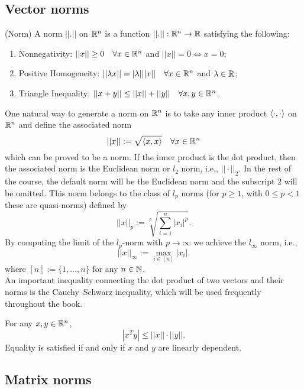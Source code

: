 \documentclass[10pt,a4paper]{article}
\begin{document}
\subsection{Vector norms}
\begin{definition} (Norm)
	A norm $||.||$ on $\mathbb{R}^n$ is a function $||.||:\mathbb{R}^n \to \mathbb{R}$ satisfying the following:
	\begin{enumerate}
		\item Nonnegativity: $||x|| \geq 0 \quad \forall x \in \mathbb{R}^n$ and $||x|| = 0 \Leftrightarrow x =0$;
		\item Positive Homogeneity:  $||\lambda x|| = |\lambda| ||x|| \quad \forall x \in \mathbb{R}^n$ and $\lambda\in \mathbb{R}$;
		\item Triangle Inequality: $||x+y|| \leq ||x|| + ||y|| \quad \forall x,y \in \mathbb{R}^n$.
	\end{enumerate}
\end{definition}
One natural way to generate a norm on $\mathbb{R}^n$ is to take any inner product $\langle \cdot, \cdot \rangle$ on $\mathbb{R}^n$ and define the associated norm
\begin{equation*}
	||x||:= \sqrt{\langle x, x \rangle} \quad \forall x \in \mathbb{R}^n
\end{equation*}
which can be proved to be a norm. If the inner product is the dot product, then the associated norm is the Euclidean norm or $l_2$ norm, i.e., $||\cdot||_2$. In the rest of the course, the default norm will be the Euclidean norm and the subscript $2$ will be omitted. This norm belongs to the class of $l_p$ norms (for $p\geq 1$, with $0\leq p<1$ these are quasi-norms) defined by 
\begin{equation*}
	||x||_p:= \sqrt[p]{\sum_{i=1}^{n}|x_i|^p}.
\end{equation*}
By computing the limit of the $l_p$-norm with $p\to\infty$ we achieve the $l_{\infty}$ norm, i.e.,
\begin{equation*}
	||x||_{\infty} := \max_{i\in[n]} |x_i|.
\end{equation*}
where $[n]:=\{1, \dots,n\}$ for any $n \in \mathbb{N}$.\\
An important inequality connecting the dot product of two vectors and their norms is the Cauchy–Schwarz inequality, which will be used frequently throughout the book.
\begin{lemma}
	For any $x,y \in \mathbb{R}^n$,
	\begin{equation*}
		|x^Ty| \leq ||x||\cdot||y||.
	\end{equation*}
Equality is satisfied if and only if $x$ and $y$ are linearly dependent.
\end{lemma}
\subsection{Matrix norms}


\end{document}
